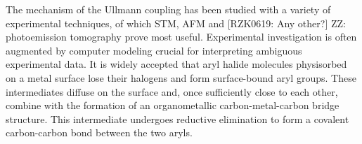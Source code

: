 \documentclass[%
 reprint,
 amsmath,amssymb,
 aps,
prb,
floatfix,
]{revtex4-2}
\newcommand{\lock}{\color{red}}
\newcommand{\zhzh}{\color{blue}}
\newcommand{\lock}{\color{black}}
\newcommand{\zhzh}{\color{blue}}
\newcommand{\comm}{\color{ForestGreen}} %
\newcommand{\sinfo}{Supplementary Information}
\begin{document}

{\lock

The mechanism of the Ullmann coupling has been studied with a variety of experimental techniques, of which STM, AFM and {\comm[RZK0619: Any other?]} {\zhzh ZZ: photoemission tomography} prove most useful. Experimental investigation is often augmented by computer modeling crucial for interpreting ambiguous experimental data.
%
%
%
It is widely accepted that aryl halide molecules physisorbed on a metal surface lose their halogens and form surface-bound aryl groups. These intermediates diffuse on the surface and, once sufficiently close to each other, combine with the formation of an organometallic carbon-metal-carbon bridge structure. This intermediate undergoes reductive elimination to form a covalent carbon-carbon bond between the two aryls. %


}%
\end{document}
